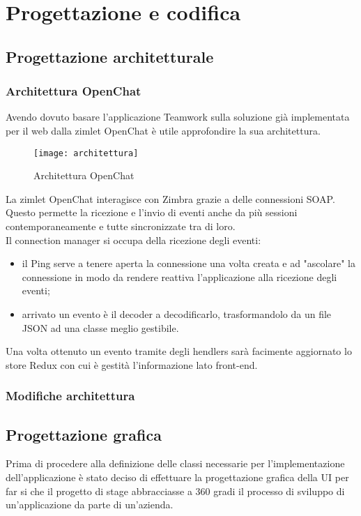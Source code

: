 
\chapter{Progettazione e codifica}\label{chap:design}

\section {Progettazione architetturale}
\subsection{Architettura OpenChat}
Avendo dovuto basare l'applicazione Teamwork sulla soluzione già implementata per il web dalla zimlet OpenChat è utile approfondire la sua architettura.
\begin{figure}[H] 
	\centering
	\texttt{[image: architettura]}
	\caption{Architettura OpenChat}
\end{figure}
La zimlet OpenChat interagisce con Zimbra grazie a delle connessioni SOAP. Questo permette la ricezione e l'invio di eventi anche da più sessioni contemporaneamente e tutte sincronizzate tra di loro.\\
Il connection manager si occupa della ricezione degli eventi:
\begin{itemize}
	\item il Ping serve a tenere aperta la connessione una volta creata e ad "ascolare" la connessione in modo da rendere reattiva l'applicazione alla ricezione degli eventi;
	\item arrivato un evento è il decoder a decodificarlo, trasformandolo da un file JSON ad una classe meglio gestibile.
\end{itemize}
Una volta ottenuto un evento tramite degli hendlers sarà facimente aggiornato lo store Redux con cui è gestità l'informazione lato front-end.


\subsection{Modifiche architettura}

\section{Progettazione grafica}
Prima di procedere alla definizione delle classi necessarie per l'implementazione 
dell'applicazione è stato deciso di effettuare la progettazione grafica della UI per far 
si che il progetto di stage abbracciasse a 360 gradi il processo di sviluppo di 
un'applicazione da parte di un'azienda.

